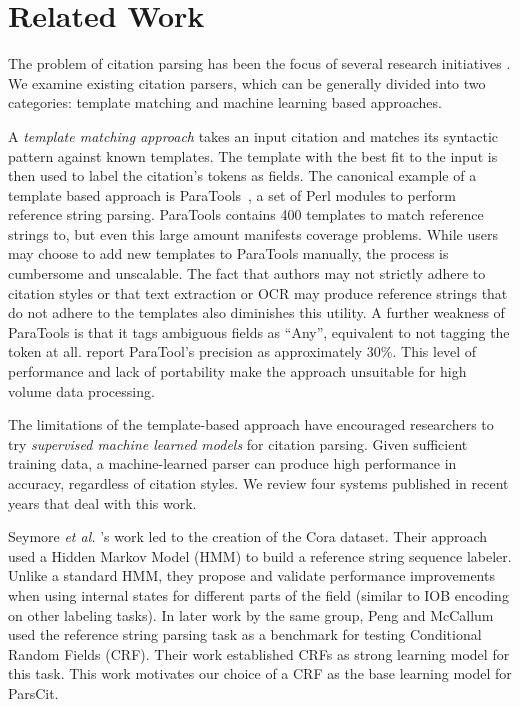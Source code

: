 \documentclass[10pt, a4paper]{article}
\begin{document}
\section {Related Work}

The problem of citation parsing has been the focus of several research
initiatives
\cite{97:_univer_citat_datab_catal_refor_schol_commun,lawrence99:_digit_librar_auton_citat_index}.
We examine existing citation parsers, which can be generally divided
into two categories: template matching and machine learning based
approaches.
 
A {\it template matching approach} takes an input citation and matches
its syntactic pattern against known templates. The template with the
best fit to the input is then used to label the citation's tokens as
fields.  The canonical example of a template based approach is
ParaTools~\cite{jewell00:_parac}, a set of Perl modules to perform
reference string parsing.  ParaTools contains 400 templates to match
reference strings to, but even this large amount manifests coverage
problems.  While users may choose to add new templates to ParaTools
manually, the process is cumbersome and unscalable.  The fact that
authors may not strictly adhere to citation styles or that text
extraction or OCR may produce reference strings that do not adhere to
the templates also diminishes this utility.  A further weakness of
ParaTools is that it tags ambiguous fields as ``Any'', equivalent to
not tagging the token at all.
\cite{huang04:_extrac_citat_metad_onlin_public} report ParaTool's
precision as approximately 30\%.  This level of performance and lack
of portability make the approach unsuitable for high volume data
processing.

The limitations of the template-based approach have encouraged
researchers to try {\it supervised machine learned models} for
citation parsing.  Given sufficient training data, a machine-learned
parser can produce high performance in accuracy, regardless of
citation styles.  We review four systems published in recent years
that deal with this work.

Seymore {\it et al.}
's work
led to the creation of the Cora dataset.  Their approach used a Hidden
Markov Model (HMM) to build a reference string sequence labeler.
Unlike a standard HMM, they propose and validate performance
improvements when using internal states for different parts of the
field (similar to IOB encoding on other labeling tasks).  In later
work by the same group, Peng and McCallum  used
the reference string parsing task as a benchmark for testing
Conditional Random Fields (CRF).  Their work established CRFs as
strong learning model for this task.  This work motivates our choice
of a CRF as the base learning model for ParsCit.
\end{document}

